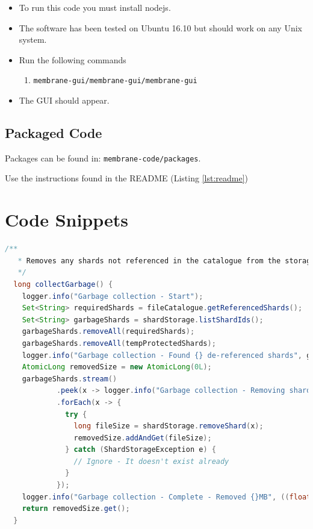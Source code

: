 \documentclass[11pt, a4paper, twoside]{report}
\def\code#1{\texttt{#1}}
\begin{document}
\begin{itemize}
 \item To run this code you must install nodejs.
 \item The software has been tested on Ubuntu 16.10 but should work on any Unix system.
 \item Run the following commands
 \begin{enumerate}
  \item \code{membrane-gui/membrane-gui/membrane-gui}
 \end{enumerate}
 \item The GUI should appear.
\end{itemize}

\subsection{Packaged Code}

Packages can be found in: \code{membrane-code/packages}.

Use the instructions found in the README (Listing \ref{lst:readme})

\section{Code Snippets}

\begin{lstlisting}[language=Java, caption=Garbage Collection Implementation, label=lst:fileGC]
  /**
   * Removes any shards not referenced in the catalogue from the storage.
   */
  long collectGarbage() {
    logger.info("Garbage collection - Start");
    Set<String> requiredShards = fileCatalogue.getReferencedShards();
    Set<String> garbageShards = shardStorage.listShardIds();
    garbageShards.removeAll(requiredShards);
    garbageShards.removeAll(tempProtectedShards);
    logger.info("Garbage collection - Found {} de-referenced shards", garbageShards.size());
    AtomicLong removedSize = new AtomicLong(0L);
    garbageShards.stream()
            .peek(x -> logger.info("Garbage collection - Removing shard: [{}]", x))
            .forEach(x -> {
              try {
                long fileSize = shardStorage.removeShard(x);
                removedSize.addAndGet(fileSize);
              } catch (ShardStorageException e) {
                // Ignore - It doesn't exist already
              }
            });
    logger.info("Garbage collection - Complete - Removed {}MB", ((float) removedSize.get()) / (1024 * 1024));
    return removedSize.get();
  }
\end{lstlisting}
\end{document}
